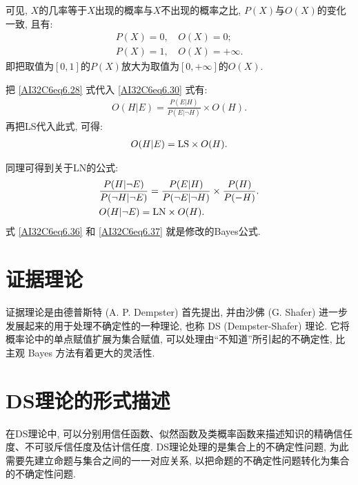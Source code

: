 可见, $X$的几率等于$X$出现的概率与$X$不出现的概率之比, $P(X)$与$O(X)$的变化一致, 且有:
\begin{align}
    P(X)=0,&\,O(X)=0;\\
    P(X)=1,&\,O(X)=+\infty.
\end{align}
即把取值为$[0,1]$的$P(X)$放大为取值为$[0,+\infty]$的$O(X)$.

把 \eqref{AI32C6eq6.28} 式代入 \eqref{AI32C6eq6.30} 式有:
\begin{align}
    O(H | E)=\frac{P(E | H)}{P(E | \neg H)} \times O(H).
\end{align}
再把LS代入此式, 可得:
\begin{align}
    O(H | E)=\textup{LS} \times O(H).
\end{align}

同理可得到关于LN的公式:
\begin{align}
    &\frac{P(H|\neg E)}{P(\neg H|\neg E)}=\frac{P(E | H)}{P(\neg E |\neg H)} \times \frac{P(H)}{P(-H)}.\label{AI32C6eq6.36} \\
    &O(H| \neg E)=\textup{LN} \times O(H). \label{AI32C6eq6.37}
\end{align}
式 \eqref{AI32C6eq6.36} 和 \eqref{AI32C6eq6.37} 就是修改的Bayes公式.
\section{证据理论}
证据理论是由德普斯特 (A. P. Dempster) 首先提出, 并由沙佛 (G. Shafer) 进一步发展起来的用于处理不确定性的一种理论, 也称 DS (Dempster-Shafer) 理论.
它将概率论中的单点赋值扩展为集合赋值, 可以处理由“不知道”所引起的不确定性, 比主观 Bayes 方法有着更大的灵活性.
\section{DS理论的形式描述}
    在DS理论中, 可以分别用信任函数、似然函数及类概率函数来描述知识的精确信任度、不可驳斥信任度及估计信任度.
DS理论处理的是集合上的不确定性问题, 为此需要先建立命题与集合之间的一一对应关系, 以把命题的不确定性问题转化为集合的不确定性问题.

